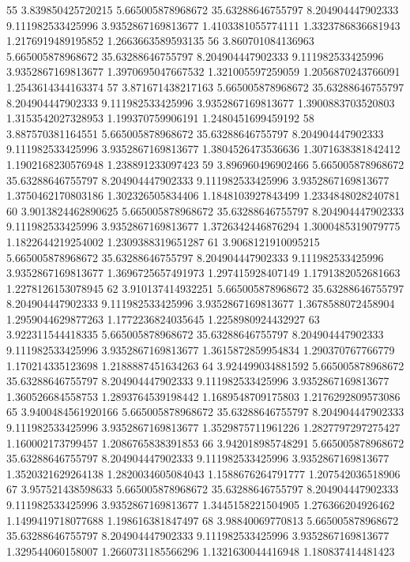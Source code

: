 {55 3.839850425720215 5.665005878968672 35.63288646755797 8.204904447902333 9.111982533425996 3.9352867169813677 1.4103381055774111 1.3323786836681943 1.2176919489195852 1.2663663589593135
56 3.860701084136963 5.665005878968672 35.63288646755797 8.204904447902333 9.111982533425996 3.9352867169813677 1.3970695047667532 1.321005597259059 1.2056870243766091 1.2543614344163374
57 3.871671438217163 5.665005878968672 35.63288646755797 8.204904447902333 9.111982533425996 3.9352867169813677 1.3900883703520803 1.3153542027328953 1.199370759906191 1.2480451699459192
58 3.887570381164551 5.665005878968672 35.63288646755797 8.204904447902333 9.111982533425996 3.9352867169813677 1.3804526473536636 1.3071638381842412 1.1902168230576948 1.238891233097423
59 3.896960496902466 5.665005878968672 35.63288646755797 8.204904447902333 9.111982533425996 3.9352867169813677 1.3750462170803186 1.302326505834406 1.1848103927843499 1.2334848028240781
60 3.9013824462890625 5.665005878968672 35.63288646755797 8.204904447902333 9.111982533425996 3.9352867169813677 1.3726342446876294 1.3000485319079775 1.1822644219254002 1.2309388319651287
61 3.9068121910095215 5.665005878968672 35.63288646755797 8.204904447902333 9.111982533425996 3.9352867169813677 1.3696725657491973 1.297415928407149 1.1791382052681663 1.2278126153078945
62 3.910137414932251 5.665005878968672 35.63288646755797 8.204904447902333 9.111982533425996 3.9352867169813677 1.3678588072458904 1.2959044629877263 1.1772236824035645 1.2258980924432927
63 3.922311544418335 5.665005878968672 35.63288646755797 8.204904447902333 9.111982533425996 3.9352867169813677 1.3615872859954834 1.290370767766779 1.170214335123698 1.2188887451634263
64 3.924499034881592 5.665005878968672 35.63288646755797 8.204904447902333 9.111982533425996 3.9352867169813677 1.360526684558753 1.2893764539198442 1.1689548709175803 1.2176292809573086
65 3.9400484561920166 5.665005878968672 35.63288646755797 8.204904447902333 9.111982533425996 3.9352867169813677 1.3529875711961226 1.2827797297275427 1.160002173799457 1.2086765838391853
66 3.942018985748291 5.665005878968672 35.63288646755797 8.204904447902333 9.111982533425996 3.9352867169813677 1.3520321629264138 1.2820034605084043 1.1588676264791777 1.207542036518906
67 3.957521438598633 5.665005878968672 35.63288646755797 8.204904447902333 9.111982533425996 3.9352867169813677 1.3445158221504905 1.276366204926462 1.1499419718077688 1.198616381847497
68 3.98840069770813 5.665005878968672 35.63288646755797 8.204904447902333 9.111982533425996 3.9352867169813677 1.329544060158007 1.2660731185566296 1.1321630044416948 1.180837414481423
}

